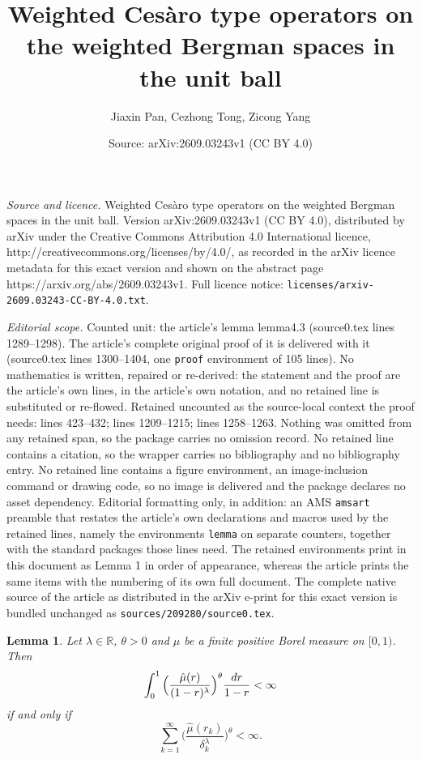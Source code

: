 \documentclass[10pt,a4paper]{amsart}
\title{Weighted Ces\`aro type operators on the weighted Bergman spaces in the unit ball}
\author{Jiaxin Pan, Cezhong Tong, Zicong Yang}
\date{Source: arXiv:2609.03243v1 (CC BY 4.0)}
\newtheorem{lemma}{Lemma}
\begin{document}
\maketitle

\noindent\emph{Source and licence.} Weighted Ces\`aro type operators on the weighted Bergman spaces in the unit ball. Version arXiv:2609.03243v1 (CC BY 4.0), distributed by arXiv under the Creative Commons Attribution 4.0 International licence, http://creativecommons.org/licenses/by/4.0/, as recorded in the arXiv licence metadata for this exact version and shown on the abstract page https://arxiv.org/abs/2609.03243v1. Full licence notice: \texttt{licenses/arxiv-2609.03243-CC-BY-4.0.txt}.\par\smallskip

\noindent\textit{Editorial scope.} Counted unit: the article's lemma lemma4.3 (source0.tex lines 1289--1298). The article's complete original proof of it is delivered with it (source0.tex lines 1300--1404, one \texttt{proof} environment of 105 lines). No mathematics is written, repaired or re-derived: the statement and the proof are the article's own lines, in the article's own notation, and no retained line is substituted or re-flowed.  Retained uncounted as the source-local context the proof needs: lines 423--432; lines 1209--1215; lines 1258--1263.  Nothing was omitted from any retained span, so the package carries no omission record.  No retained line contains a citation, so the wrapper carries no bibliography and no bibliography entry.  No retained line contains a figure environment, an image-inclusion command or drawing code, so no image is delivered and the package declares no asset dependency.  Editorial formatting only, in addition: an AMS \texttt{amsart} preamble that restates the article's own declarations and macros used by the retained lines, namely the environments \texttt{lemma} on separate counters, together with the standard packages those lines need.  The retained environments print in this document as Lemma 1 in order of appearance, whereas the article prints the same items with the numbering of its own full document.  The complete native source of the article as distributed in the arXiv e-print for this exact version is bundled unchanged as \texttt{sources/209280/source0.tex}.
\begin{lemma}  \label{lemma2.7}
  Let $\lambda\in\mathbb{R}$, $\theta>0$ and $\mu$ be a finite positive Borel measure on $[0,1)$. Then
\begin{equation}\label{equa2.1}
\int_{0}^1\Big(\frac{\hat{\mu}(r)}{(1-r)^{\lambda}}\Big)^{\theta}\frac{{\rm d}r}{1-r}<\infty
\end{equation}
if and only if 
\begin{equation}\label{equa2.2}
\sum_{k=1}^{\infty}\Big(\frac{\hat{\mu}(r_k)}{\delta_k^{\lambda}}\Big)^{\theta}<\infty.
\end{equation}
\end{lemma}
\end{document}

